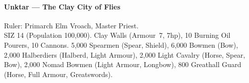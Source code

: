 \documentclass[itdr]{subfiles}
\begin{document}
\paragraph{Unktar --- The Clay City of Flies}
Ruler: Primarch Elm Vroach, Master Priest.\\
SIZ 14 (Population 100,000).
Clay Walls (Armour~7, 7hp), 10 Burning Oil Pourers, 10 Cannons. 5,000 Spearmen (Spear, Shield), 6,000 Bowmen (Bow), 2,000 Halberdiers (Halberd, Light Armour), 2,000 Light Cavalry (Horse, Spear, Bow), 2,000 Nomad Bowmen (Light Armour, Longbow), 800 Greathall Guard (Horse, Full Armour, Greatswords).
\end{document}
